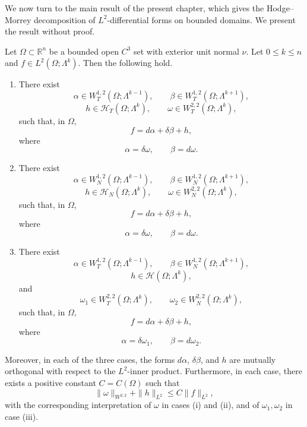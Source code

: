 We now turn to the main result of the present chapter, which gives the Hodge--Morrey decomposition of \(L^2\)-differential forms on bounded domains. We present the result without proof.

\begin{theorem}
    Let \(\Omega\subset\mathbb{R}^n\) be a bounded open \(C^3\) set with exterior unit normal \(\nu\). Let \(0\leq k\leq n\) and \(f\in L^2(\Omega;\Lambda^k)\). Then the following hold.

    \begin{enumerate}
        \item There exist
        \[
            \alpha\in W_T^{1,2}(\Omega;\Lambda^{k-1}),
            \qquad
            \beta\in W_T^{1,2}(\Omega;\Lambda^{k+1}),
        \]
        \[
            h\in\mathcal{H}_T(\Omega;\Lambda^k),
            \qquad
            \omega\in W_T^{2,2}(\Omega;\Lambda^k),
        \]
        such that, in \(\Omega\),
        \[
            f=d\alpha+\delta\beta+h,
        \]
        where
        \[
            \alpha=\delta\omega,
            \qquad
            \beta=d\omega.
        \]

        \item There exist
        \[
            \alpha\in W_N^{1,2}(\Omega;\Lambda^{k-1}),
            \qquad
            \beta\in W_N^{1,2}(\Omega;\Lambda^{k+1}),
        \]
        \[
            h\in\mathcal{H}_N(\Omega;\Lambda^k),
            \qquad
            \omega\in W_N^{2,2}(\Omega;\Lambda^k),
        \]
        such that, in \(\Omega\),
        \[
            f=d\alpha+\delta\beta+h,
        \]
        where
        \[
            \alpha=\delta\omega,
            \qquad
            \beta=d\omega.
        \]

        \item There exist
        \[
            \alpha\in W_T^{1,2}(\Omega;\Lambda^{k-1}),
            \qquad
            \beta\in W_N^{1,2}(\Omega;\Lambda^{k+1}),
        \]
        \[
            h\in\mathcal{H}(\Omega;\Lambda^k),
        \]
        and
        \[
            \omega_1\in W_T^{2,2}(\Omega;\Lambda^k),
            \qquad
            \omega_2\in W_N^{2,2}(\Omega;\Lambda^k),
        \]
        such that, in \(\Omega\),
        \[
            f=d\alpha+\delta\beta+h,
        \]
        where
        \[
            \alpha=\delta\omega_1,
            \qquad
            \beta=d\omega_2.
        \]
    \end{enumerate}

    Moreover, in each of the three cases, the forms \(d\alpha\), \(\delta\beta\), and \(h\) are mutually orthogonal with respect to the \(L^2\)-inner product. Furthermore, in each case, there exists a positive constant \(C=C(\Omega)\) such that
    \[
        \|\omega\|_{W^{2,2}}+\|h\|_{L^2}
        \leq C\|f\|_{L^2},
    \]
    with the corresponding interpretation of \(\omega\) in cases \textup{(i)} and \textup{(ii)}, and of \(\omega_1,\omega_2\) in case \textup{(iii)}.
\end{theorem}